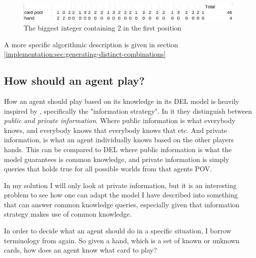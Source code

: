 \begin{figure}
	\centering
\includegraphics[width=13cm,frame]{images/decrement.png}
	\caption{The biggest integer containing 2 in the first position}
	\label{fig:decrement}
\end{figure}


A more specific algorithmic description is given in section \ref{implementation:sec:generating-distinct-combinations}

\subsection{How should an agent play?} \label{sec:how-should-an-agent-play}

How an agent should play based on its knowledge in its DEL model is heavily inspired by \cite{CoxEtAl2015}, specifically the "information strategy". 
In it they distinguish between \emph{public and private information}. Where public information is what everybody knows, and everybody knows that everybody knows that etc. And private information, is what an agent individually knows based on the other players hands. This can be compared to DEL where public information is what the model guarantees is common knowledge, and private information is simply queries that holds true for all possible worlds from that agents POV.

In my solution I will only look at private information, but it is an interesting problem to see how one can adapt the model I have described into something that can answer common knowledge queries, especially given that \cite{CoxEtAl2015} information strategy makes use of common knowledge.

In order to decide what an agent should do in a specific situation, I borrow terminology from \cite{CoxEtAl2015} again. So given a hand, which is a  set of known or unknown cards, how does an agent know what card to play?




